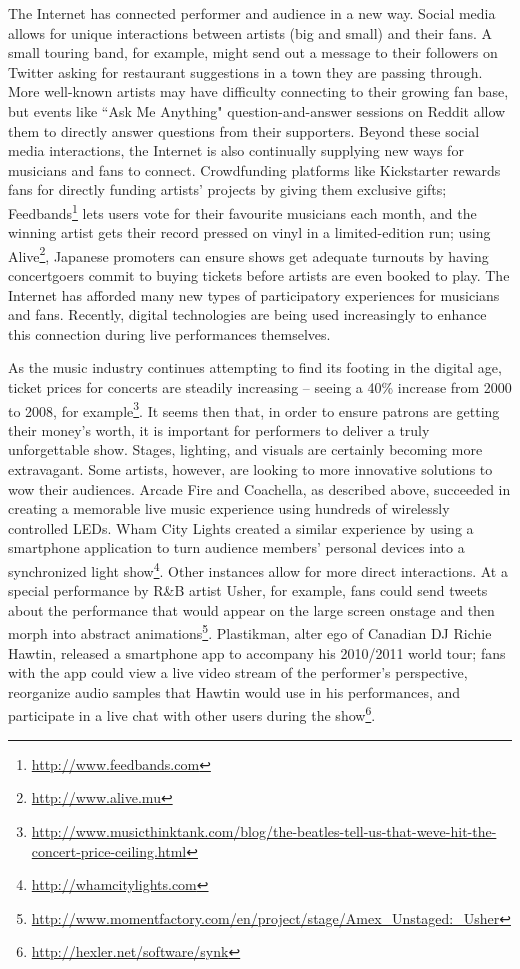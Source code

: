 The Internet has connected performer and audience in a new way. Social media allows for unique interactions between artists (big and small) and their fans. A small touring band, for example, might send out a message to their followers on Twitter asking for restaurant suggestions in a town they are passing through. More well-known artists may have difficulty connecting to their growing fan base, but events like ``Ask Me Anything" question-and-answer sessions on Reddit allow them to directly answer questions from their supporters. Beyond these social media interactions, the Internet is also continually supplying new ways for musicians and fans to connect. Crowdfunding platforms like Kickstarter rewards fans for directly funding artists' projects by giving them exclusive gifts; Feedbands\footnote{\url{http://www.feedbands.com}} lets users vote for their favourite musicians each month, and the winning artist gets their record pressed on vinyl in a limited-edition run; using Alive\footnote{\url{http://www.alive.mu}}, Japanese promoters can ensure shows get adequate turnouts by having concertgoers commit to buying tickets before artists are even booked to play. The Internet has afforded many new types of participatory experiences for musicians and fans. Recently, digital technologies are being used increasingly to enhance this connection during live performances themselves.

As the music industry continues attempting to find its footing in the digital age, ticket prices for concerts are steadily increasing -- seeing a 40\% increase from 2000 to 2008, for example\footnote{\url{http://www.musicthinktank.com/blog/the-beatles-tell-us-that-weve-hit-the-concert-price-ceiling.html}}. It seems then that, in order to ensure patrons are getting their money's worth, it is important for performers to deliver a truly unforgettable show. Stages, lighting, and visuals are certainly becoming more extravagant. Some artists, however, are looking to more innovative solutions to wow their audiences. Arcade Fire and Coachella, as described above, succeeded in creating a memorable live music experience using hundreds of wirelessly controlled LEDs. Wham City Lights created a similar experience by using a smartphone application to turn audience members' personal devices into a synchronized light show\footnote{\url{http://whamcitylights.com}}. Other instances allow for more direct interactions. At a special performance by R\&B artist Usher, for example, fans could send tweets about the performance that would appear on the large screen onstage and then morph into abstract animations\footnote{\url{http://www.momentfactory.com/en/project/stage/Amex_Unstaged:_Usher}}. Plastikman, alter ego of Canadian DJ Richie Hawtin, released a smartphone app to accompany his 2010/2011 world tour; fans with the app could view a live video stream of the performer's perspective, reorganize audio samples that Hawtin would use in his performances, and participate in a live chat with other users during the show\footnote{\url{http://hexler.net/software/synk}}.

